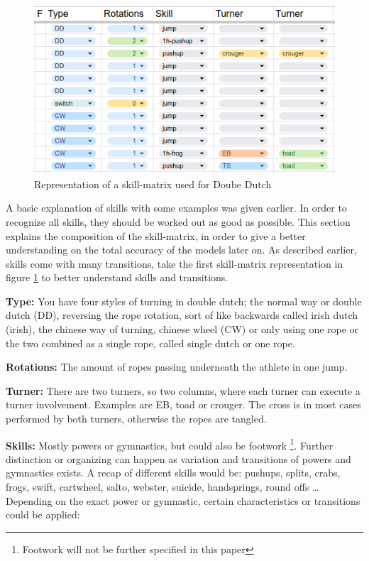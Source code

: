 \begin{figure}
    \centering
    \includegraphics[width=0.95\linewidth]{img/doubledutch-matrix}
    \caption[skill-matrix-DD]{Representation of a skill-matrix used for Doube Dutch}
    \label{fig:doubledutch-skill-matrix}
\end{figure}

A basic explanation of skills with some examples was given earlier. In order to recognize all skills, they should be worked out as good as possible. This section explains the composition of the skill-matrix, in order to give a better understanding on the total accuracy of the models later on. As described earlier, skills come with many transitions, take the first skill-matrix representation in figure \ref{fig:doubledutch-skill-matrix} to better understand skills and transitions.

\textbf{Type:} You have four styles of turning in double dutch; the normal way or double dutch (DD), reversing the rope rotation, sort of like backwards called irish dutch (irish), the chinese way of turning, chinese wheel (CW) or only using one rope or the two combined as a single rope, called single dutch or one rope.

\textbf{Rotations:} The amount of ropes passing underneath the athlete in one jump.

\textbf{Turner:} There are two turners, so two columns, where each turner can execute a turner involvement. Examples are EB, toad or crouger. The cross is in most cases performed by both turners, otherwise the ropes are tangled.

\textbf{Skills:} Mostly powers or gymnastics, but could also be footwork \footnote{Footwork will not be further specified in this paper}. Further distinction or organizing can happen as variation and transitions of powers and gymnastics exists. A recap of different skills would be: pushups, splits, crabs, frogs, swift, cartwheel, salto, webster, suicide, handsprings, round offs \dots %
Depending on the exact power or gymnastic, certain characteristics or transitions could be applied:

